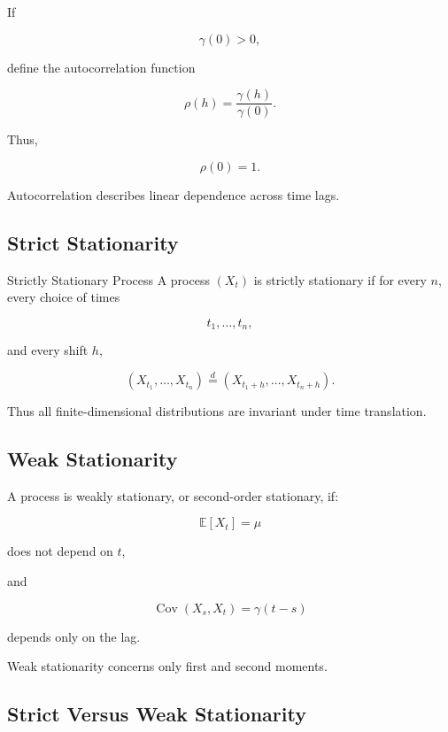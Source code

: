If

\[
\gamma(0)>0,
\]

define the autocorrelation function

\[
\boxed{
\rho(h)
=
\frac{
\gamma(h)
}{
\gamma(0)
}.
}
\]

Thus,

\[
\boxed{
\rho(0)=1.
}
\]

Autocorrelation describes linear dependence across time lags.

\subsection{Strict Stationarity}
\label{subsec:strict-stationarity}

\begin{definitionbox}{Strictly Stationary Process}
A process \((X_t)\) is strictly stationary if for every \(n\), every
choice of times

\[
t_1,\ldots,t_n,
\]

and every shift \(h\),

\[
\boxed{
(X_{t_1},\ldots,X_{t_n})
\overset{d}{=}
(X_{t_1+h},\ldots,X_{t_n+h}).
}
\]
\end{definitionbox}

Thus all finite-dimensional distributions are invariant under time
translation.

\subsection{Weak Stationarity}
\label{subsec:weak-stationarity}

A process is weakly stationary, or second-order stationary, if:

\[
\boxed{
\mathbb{E}[X_t]=\mu
}
\]

does not depend on \(t\),

and

\[
\boxed{
\operatorname{Cov}(X_s,X_t)
=
\gamma(t-s)
}
\]

depends only on the lag.

Weak stationarity concerns only first and second moments.

\subsection{Strict Versus Weak Stationarity}
\label{subsec:strict-versus-weak-stationarity}

